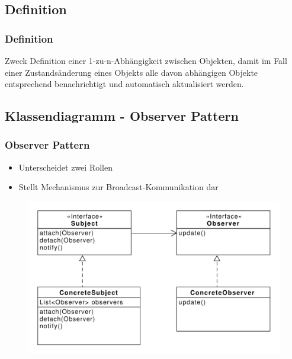 \subsection{Definition}
\begin{frame}
  \frametitle{Definition}

  \begin{block}{Zweck}
  	Definition einer 1-zu-n-Abhängigkeit zwischen Objekten, damit im Fall einer Zustandsänderung eines Objekts alle davon abhängigen Objekte entsprechend benachrichtigt und automatisch aktualisiert werden.
  \end{block}
  
\end{frame}

\subsection{Klassendiagramm - Observer Pattern}
\begin{frame}
	\frametitle{Observer Pattern}
	\begin{itemize}
		\item Unterscheidet zwei Rollen
		\item Stellt Mechanismus zur Broadcast-Kommunikation dar
	\end{itemize}	
	
  	\begin{figure}
		\includegraphics[scale=.4]{paper/observer/observer}
	\end{figure}
\end{frame}


